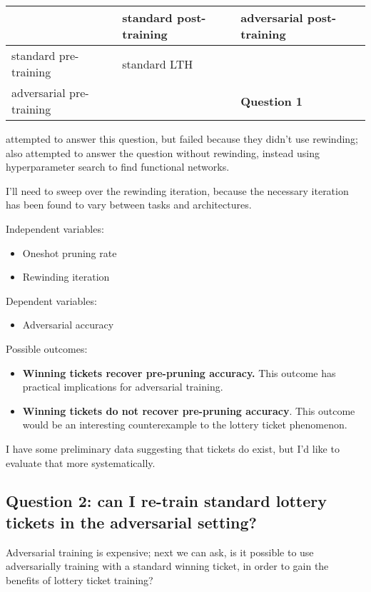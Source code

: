 \documentclass[11pt]{article}
\begin{document}
\begin{center}
\begin{tabular}{lll}
 & standard post-training & adversarial post-training\\
\hline
standard pre-training & standard LTH & \\
adversarial pre-training &  & \textbf{Question 1}\\
\end{tabular}
\end{center}

\citep{RobustnessOrCompression} attempted to answer this question, but failed because they didn't use rewinding;
\citep{anonymous2020boosting} also attempted to answer the question without rewinding, instead using hyperparameter search
to find functional networks.

I'll need to sweep over the rewinding iteration, because the necessary iteration has been found to vary between tasks and architectures.

Independent variables:
\begin{itemize}
\item Oneshot pruning rate
\item Rewinding iteration
\end{itemize}

Dependent variables:
\begin{itemize}
\item Adversarial accuracy
\end{itemize}

Possible outcomes:
\begin{itemize}
\item \textbf{Winning tickets recover pre-pruning accuracy.}
This outcome has practical implications for adversarial training.

\item \textbf{Winning tickets do not recover pre-pruning accuracy}.
This outcome would be an interesting counterexample to the lottery ticket phenomenon.
\end{itemize}

I have some preliminary data suggesting that tickets do exist, but I'd like to evaluate that more systematically.

\subsection{Question 2: can I re-train standard lottery tickets in the adversarial setting?}
\label{sec:org59c5664}
Adversarial training is expensive; next we can ask, is it possible to use adversarially training with a standard winning ticket,
in order to gain the benefits of lottery ticket training?
\end{document}

